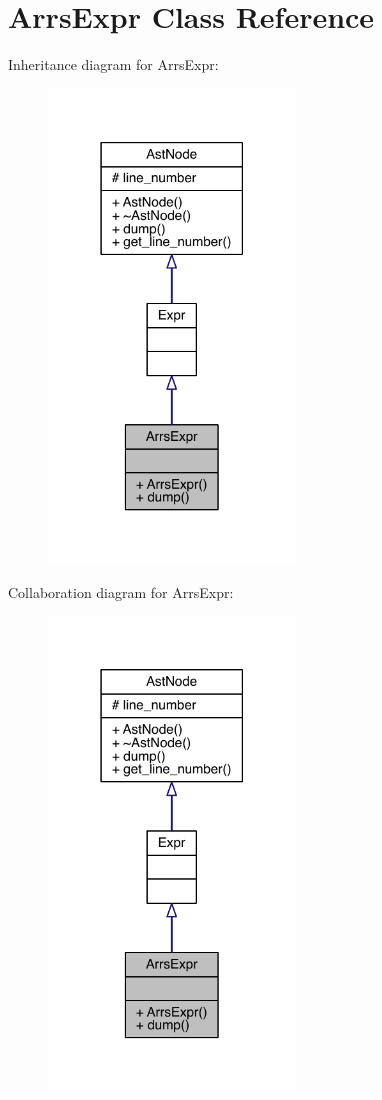 \hypertarget{class_arrs_expr}{}\section{Arrs\+Expr Class Reference}
\label{class_arrs_expr}


Inheritance diagram for Arrs\+Expr\+:\nopagebreak
\begin{figure}[H]
\begin{center}
\leavevmode
\includegraphics[width=186pt]{class_arrs_expr__inherit__graph}
\end{center}
\end{figure}


Collaboration diagram for Arrs\+Expr\+:\nopagebreak
\begin{figure}[H]
\begin{center}
\leavevmode
\includegraphics[width=186pt]{class_arrs_expr__coll__graph}
\end{center}
\end{figure}
